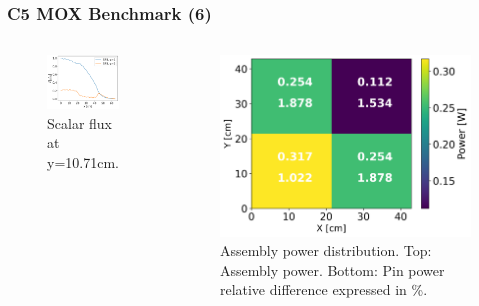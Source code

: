 \begin{frame}
\frametitle{C5 MOX Benchmark (6)}

\begin{columns}
    \column[t]{5.5cm}
    \begin{figure}[htbp!]
        \begin{center}
            \includegraphics[width=6cm]{figures/sp3-flux-output-correct}
        \end{center}
        \caption{Scalar flux at y=10.71cm.}
    \end{figure}

    \column[t]{5.5cm}
    \begin{figure}[htbp!]
        \begin{center}
            \includegraphics[width=6.cm]{figures/distrib}
        \end{center}
        \caption{Assembly power distribution. Top: Assembly power. Bottom: Pin power relative difference expressed in \%.}
    \end{figure}

\end{columns}
\end{frame}






